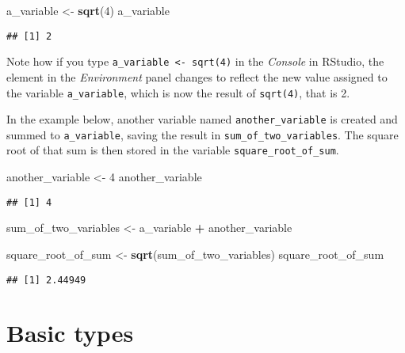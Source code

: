 \documentclass[
]{book}
\newenvironment{Shaded}{\begin{snugshade}}{\end{snugshade}}
\newcommand{\DecValTok}[1]{\textcolor[rgb]{0.00,0.00,0.81}{#1}}
\newcommand{\KeywordTok}[1]{\textcolor[rgb]{0.13,0.29,0.53}{\textbf{#1}}}
\newcommand{\NormalTok}[1]{#1}
\newcommand{\OperatorTok}[1]{\textcolor[rgb]{0.81,0.36,0.00}{\textbf{#1}}}
\newcommand{\StringTok}[1]{\textcolor[rgb]{0.31,0.60,0.02}{#1}}
\begin{document}
\begin{Shaded}
\begin{Highlighting}[]
\NormalTok{a_variable <-}\StringTok{ }\KeywordTok{sqrt}\NormalTok{(}\DecValTok{4}\NormalTok{)}
\NormalTok{a_variable}
\end{Highlighting}
\end{Shaded}

\begin{verbatim}
## [1] 2
\end{verbatim}

Note how if you type \texttt{a\_variable\ \textless{}-\ sqrt(4)} in the \emph{Console} in RStudio, the element in the \emph{Environment} panel changes to reflect the new value assigned to the variable \texttt{a\_variable}, which is now the result of \texttt{sqrt(4)}, that is 2.

In the example below, another variable named \texttt{another\_variable} is created and summed to \texttt{a\_variable}, saving the result in \texttt{sum\_of\_two\_variables}. The square root of that sum is then stored in the variable \texttt{square\_root\_of\_sum}.

\begin{Shaded}
\begin{Highlighting}[]
\NormalTok{another_variable <-}\StringTok{ }\DecValTok{4}
\NormalTok{another_variable}
\end{Highlighting}
\end{Shaded}

\begin{verbatim}
## [1] 4
\end{verbatim}

\begin{Shaded}
\begin{Highlighting}[]
\NormalTok{sum_of_two_variables <-}\StringTok{ }\NormalTok{a_variable }\OperatorTok{+}\StringTok{ }\NormalTok{another_variable}

\NormalTok{square_root_of_sum <-}\StringTok{ }\KeywordTok{sqrt}\NormalTok{(sum_of_two_variables)}
\NormalTok{square_root_of_sum}
\end{Highlighting}
\end{Shaded}

\begin{verbatim}
## [1] 2.44949
\end{verbatim}

\hypertarget{basic-types}{%
\section{Basic types}\label{basic-types}}
\end{document}
